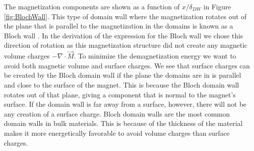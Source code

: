 \documentclass[12pt, a4paper]{article}		%
\numberwithin{equation}{section}
\begin{document}
The magnetization components are shown as a function of $x/\delta_{DW}$ in Figure \ref{fig:BlochWall}. This type of domain wall where the magnetization rotates out of the plane that is parallel to the magnetization in the domains is known as a Bloch wall \cite{Bloch1932}. In the derivation of the expression for the Bloch wall we chose this direction of rotation as this magnetization structure did not create any magnetic volume charges $-\nabla\cdot\vec{M}$. To minimize the demagnetization energy we want to avoid both magnetic volume and surface charges. We see that surface charges can be created by the Bloch domain wall if the plane the domains are in is parallel and close to the surface of the magnet. This is because the Bloch domain wall rotates out of that plane, giving a component that is normal to the magnet's surface. If the domain wall is far away from a surface, however, there will not be any creation of a surface charge. Bloch domain walls are the most common domain walls in bulk materials. This is because of the thickness of the material makes it more energetically favorable to avoid volume charges than surface charges.
\end{document}
